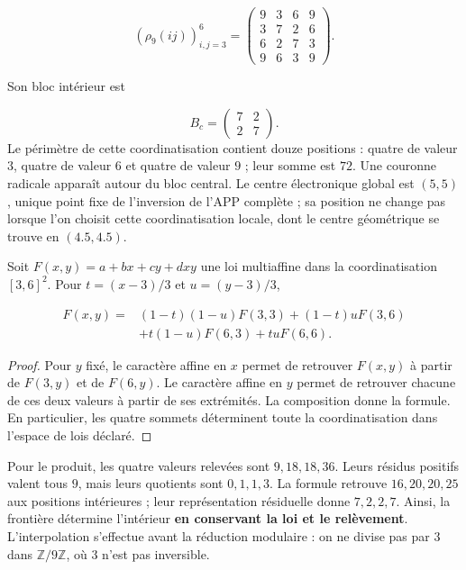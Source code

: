 \[
\left(\rho_9(ij)\right)_{i,j=3}^{6}=
\begin{pmatrix}
9&3&6&9\\
3&7&2&6\\
6&2&7&3\\
9&6&3&9
\end{pmatrix}.
\]


Son bloc intérieur est

\[
B_c=\begin{pmatrix}7&2\\2&7\end{pmatrix}.
\]
Le périmètre de cette coordinatisation contient douze positions : quatre de valeur \(3\), quatre de valeur \(6\) et quatre de valeur \(9\) ; leur somme est \(72\). Une couronne radicale apparaît autour du bloc central. Le centre électronique global est \((5,5)\), unique point fixe de l'inversion de l'APP complète ; sa position ne change pas lorsque l'on choisit cette coordinatisation locale, dont le centre géométrique se trouve en \((4.5,4.5)\).

\begin{proposition}
\label{prop:centro-frontera-recuperacion}
Soit \(F(x,y)=a+bx+cy+dxy\) une loi multiaffine dans la coordinatisation \([3,6]^2\). Pour \(t=(x-3)/3\) et \(u=(y-3)/3\),

\[
\begin{aligned}
F(x,y)={}&(1-t)(1-u)F(3,3)+(1-t)uF(3,6)\\
&+t(1-u)F(6,3)+tuF(6,6).
\end{aligned}
\]
\end{proposition}
\begin{proof}
Pour \(y\) fixé, le caractère affine en \(x\) permet de retrouver \(F(x,y)\) à partir de \(F(3,y)\) et de \(F(6,y)\). Le caractère affine en \(y\) permet de retrouver chacune de ces deux valeurs à partir de ses extrémités. La composition donne la formule. En particulier, les quatre sommets déterminent toute la coordinatisation dans l'espace de lois déclaré.
\end{proof}

Pour le produit, les quatre valeurs relevées sont \(9,18,18,36\). Leurs résidus positifs valent tous \(9\), mais leurs quotients sont \(0,1,1,3\). La formule retrouve \(16,20,20,25\) aux positions intérieures ; leur représentation résiduelle donne \(7,2,2,7\). Ainsi, la frontière détermine l'intérieur \textbf{en conservant la loi et le relèvement}. L'interpolation s'effectue avant la réduction modulaire : on ne divise pas par \(3\) dans \(\mathbb Z/9\mathbb Z\), où \(3\) n'est pas inversible.


